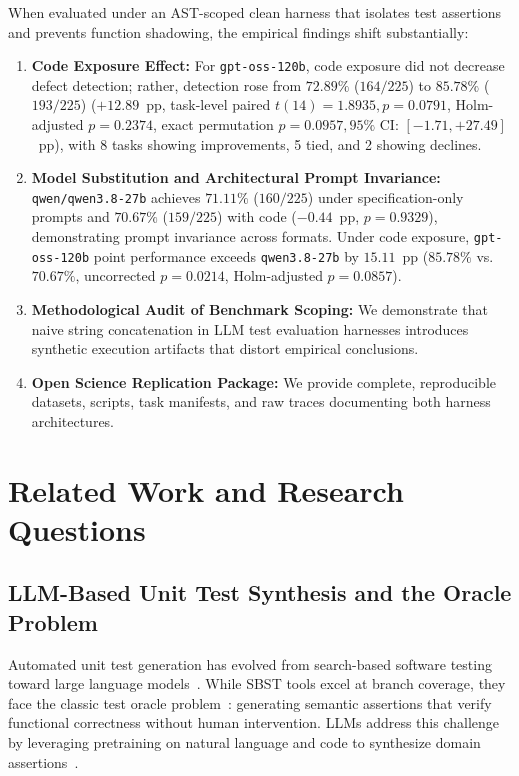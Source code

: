 \documentclass[11pt,a4paper]{article}
\begin{document}
When evaluated under an AST-scoped clean harness that isolates test assertions and prevents function shadowing, the empirical findings shift substantially:
\begin{enumerate}
    \item \textbf{Code Exposure Effect:} For \texttt{gpt-oss-120b}, code exposure did not decrease defect detection; rather, detection rose from $72.89\%$ ($164/225$) to $85.78\%$ ($193/225$) ($+12.89$~pp, task-level paired $t(14) = 1.8935, p = 0.0791$, Holm-adjusted $p = 0.2374$, exact permutation $p = 0.0957, 95\%$ CI: $[-1.71, +27.49]$~pp), with 8 tasks showing improvements, 5 tied, and 2 showing declines.
    \item \textbf{Model Substitution and Architectural Prompt Invariance:} \texttt{qwen/qwen3.8-27b} achieves $71.11\%$ ($160/225$) under specification-only prompts and $70.67\%$ ($159/225$) with code ($-0.44$~pp, $p = 0.9329$), demonstrating prompt invariance across formats. Under code exposure, \texttt{gpt-oss-120b} point performance exceeds \texttt{qwen3.8-27b} by $15.11$~pp ($85.78\%$ vs.\ $70.67\%$, uncorrected $p = 0.0214$, Holm-adjusted $p = 0.0857$).
    \item \textbf{Methodological Audit of Benchmark Scoping:} We demonstrate that naive string concatenation in LLM test evaluation harnesses introduces synthetic execution artifacts that distort empirical conclusions.
    \item \textbf{Open Science Replication Package:} We provide complete, reproducible datasets, scripts, task manifests, and raw traces documenting both harness architectures.
\end{enumerate}


\section{Related Work and Research Questions}
\label{sec:related}

\subsection{LLM-Based Unit Test Synthesis and the Oracle Problem}
Automated unit test generation has evolved from search-based software testing toward large language models~\cite{fraser2011evosuite,lemieux2023codamosa}. While SBST tools excel at branch coverage, they face the classic test oracle problem~\cite{barr2015oracle}: generating semantic assertions that verify functional correctness without human intervention. LLMs address this challenge by leveraging pretraining on natural language and code to synthesize domain assertions~\cite{schafer2024testpilot,alshahwan2024automated,pizzorno2025coverup}. 
\end{document}
